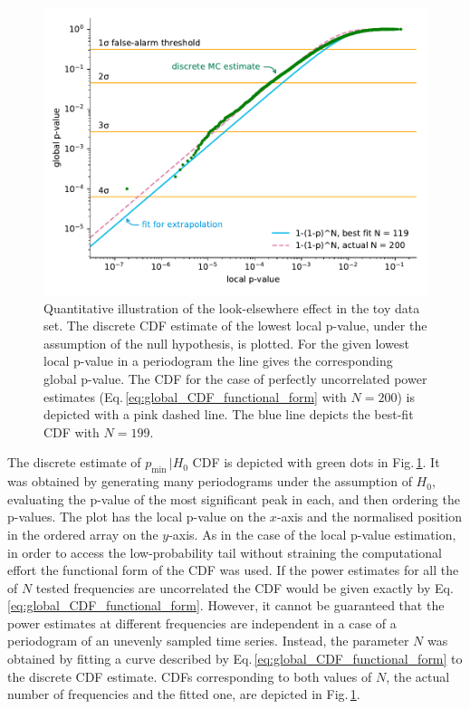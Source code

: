 \begin{figure}
  \centering
  \includegraphics[width=\linewidth]{gfx/axions/MC_estimation_global.pdf}
  \caption{Quantitative illustration of the look-elsewhere effect in the toy data set.
  The discrete CDF estimate of the lowest local p-value, under the assumption of the null hypothesis, is plotted.
  For the given lowest local p-value in a periodogram the line gives the corresponding global p-value.
  The CDF for the case of perfectly uncorrelated power estimates (Eq.\,\ref{eq:global_CDF_functional_form} with $N=200$) is depicted with a pink dashed line.
  The blue line depicts the best-fit CDF with $N=199$.}\label{fig:P_look-elsewhere}
\end{figure}

The discrete estimate of $p_\text{min} \, | H_0$ CDF is depicted with green dots in Fig.\,\ref{fig:P_look-elsewhere}.
It was obtained by generating many periodograms under the assumption of $H_0$, evaluating the p-value of the most significant peak in each, and then ordering the p-values.
The plot has the local p-value on the $x$-axis and the normalised position in the ordered array on the $y$-axis.
As in the case of the local p-value estimation, in order to access the low-probability tail without straining the computational effort the functional form of the CDF was used.
If the power estimates for all the of $N$ tested frequencies are uncorrelated the CDF would be given exactly by Eq.\,\ref{eq:global_CDF_functional_form}.
However, it cannot be guaranteed that the power estimates at different frequencies are independent in a case of a periodogram of an unevenly sampled time series.
Instead, the parameter $N$ was obtained by fitting a curve described by Eq.\,\ref{eq:global_CDF_functional_form} to the discrete CDF estimate.
CDFs corresponding to both values of $N$, the actual number of frequencies and the fitted one, are depicted in Fig.\,\ref{fig:P_look-elsewhere}.


